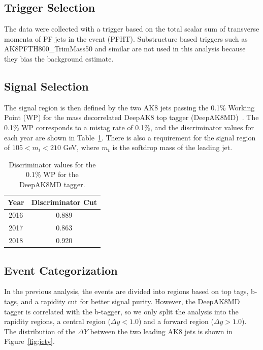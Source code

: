 \subsection{Trigger Selection}
\label{sec:trigeff}


The data were collected with a trigger based on the total scalar sum of transverse momenta of PF jets in the event (PFHT). Substructure based triggers such as AK8PFTH800\_TrimMass50 and similar are not used in this analysis because they bias the background estimate.


\subsection{Signal Selection}
\label{sec:signal}

The signal region is then defined by the two AK8 jets passing the 0.1\% Working Point (WP) for the mass decorrelated DeepAK8 top tagger (DeepAK8MD)~\cite{DeepAK8TopTagwiki}. The 0.1\% WP corresponds to a mistag rate of 0.1\%, and the discriminator values for each year are shown in Table~\ref{tab:deepak8}. There is also a requirement for the signal region of $105 < m_t < 210$ GeV, where $m_t$ is the softdrop mass of the leading jet.

\begin{table}[h!]
	\centering
	\begin{tabular}{|| c c  ||} 
		\hline
		Year & Discriminator Cut \\ 
		\hline\hline
		2016 & 0.889  \\ 
		2017 & 0.863  \\ 
		2018 & 0.920  \\ 
		\hline
	\end{tabular}
	\caption{Discriminator values for the 0.1\% WP for the DeepAK8MD tagger.}
	\label{tab:deepak8}
\end{table}


\subsection{Event Categorization}
\label{sec:selection}




In the previous analysis, the events are divided into regions based on top tags, b-tags, and a rapidity cut for better signal purity. However, the DeepAK8MD tagger is correlated with the b-tagger, so we only split the analysis into the rapidity regions, a central region ($\Delta y < 1.0$) and a forward region ($\Delta y > 1.0$). The distribution of the $\Delta Y$ between the two leading AK8 jets is shown in Figure~\ref{fig:jety}.


